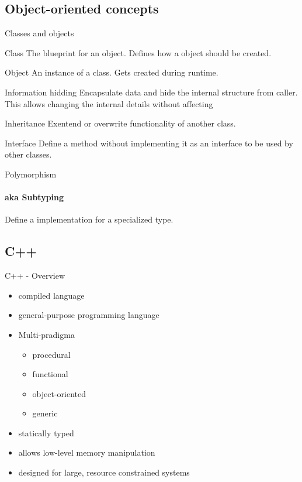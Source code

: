 \documentclass{beamer}
\begin{document}
\subsection{Object-oriented concepts}

\begin{frame}{Classes and objects}

\begin{block}{Class}
The blueprint for an object. Defines how a object should be created.
\end{block}

\begin{block}{Object}
An instance of a class. Gets created during runtime.
\end{block}

\end{frame}

\begin{frame}{Information hidding}
Encapsulate data and hide the internal structure from caller. This allows
changing the internal details without affecting 
\end{frame}

\begin{frame}{Inheritance}
Exentend or overwrite functionality of another class.
\end{frame}

\begin{frame}{Interface}
Define a method without implementing it as an interface to be used by other
classes.
\end{frame}

\begin{frame}{Polymorphism}
\framesubtitle{aka Subtyping}
Define a implementation for a specialized type.
\end{frame}

\subsection{C++}
\begin{frame}{C++ - Overview}
\begin{itemize}
  \item compiled language
  \item general-purpose programming language
  \item Multi-pradigma
  \begin{itemize}
    \item procedural
    \item functional
    \item object-oriented
    \item generic
  \end{itemize}
  \item statically typed
  \item allows low-level memory manipulation
  \item designed for large, resource constrained systems 
\end{itemize}
\end{frame}
\end{document}
